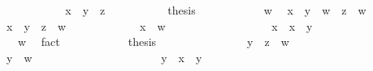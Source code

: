 \begin{isabellebody}
\isanewline
\ \ \ \ \ \ \isamarkupfalse%
\ \isamarkupfalse%
\ {\isachardoublequoteopen}{\isachardot}{\isachardot}{\isachardot}\ {\isasymsqsubseteq}\ x\ {\isasymsqunion}\ {\isacharparenleft}y\ {\isasymsqunion}\ z{\isacharparenright}{\isachardoublequoteclose}\ \isacommand{{\isachardot}{\isachardot}}\isamarkupfalse%
\isanewline
\ \ \ \ \ \ \isamarkupfalse%
\ \isamarkupfalse%
\ {\isacharquery}thesis\ \isacommand{{\isachardot}}\isamarkupfalse%
\isanewline
\ \ \ \ \isamarkupfalse%
\isanewline
\ \ \ \ \isamarkupfalse%
\ w\ \isamarkupfalse%
\ {\isachardoublequoteopen}x\ {\isasymsqunion}\ y\ {\isasymsqsubseteq}\ w{\isachardoublequoteclose}\ \ {\isachardoublequoteopen}z\ {\isasymsqsubseteq}\ w{\isachardoublequoteclose}\isanewline
\ \ \ \ \isamarkupfalse%
\ {\isachardoublequoteopen}x\ {\isasymsqunion}\ {\isacharparenleft}y\ {\isasymsqunion}\ z{\isacharparenright}\ {\isasymsqsubseteq}\ w{\isachardoublequoteclose}\isanewline
\ \ \ \ \isamarkupfalse%
\isanewline
\ \ \ \ \ \ \isamarkupfalse%
\ {\isachardoublequoteopen}x\ {\isasymsqsubseteq}\ w{\isachardoublequoteclose}\isanewline
\ \ \ \ \ \ \isamarkupfalse%
\ {\isacharminus}\isanewline
\ \ \ \ \ \ \ \ \isamarkupfalse%
\ {\isachardoublequoteopen}x\ {\isasymsqsubseteq}\ x\ {\isasymsqunion}\ y{\isachardoublequoteclose}\ \isacommand{{\isachardot}{\isachardot}}\isamarkupfalse%
\isanewline
\ \ \ \ \ \ \ \ \isamarkupfalse%
\ \isamarkupfalse%
\ {\isachardoublequoteopen}{\isasymdots}\ {\isasymsqsubseteq}\ w{\isachardoublequoteclose}\ \isamarkupfalse%
\ fact\isanewline
\ \ \ \ \ \ \ \ \isamarkupfalse%
\ \isamarkupfalse%
\ {\isacharquery}thesis\ \isacommand{{\isachardot}}\isamarkupfalse%
\isanewline
\ \ \ \ \ \ \isamarkupfalse%
\isanewline
\ \ \ \ \ \ \isamarkupfalse%
\ {\isachardoublequoteopen}y\ {\isasymsqunion}\ z\ {\isasymsqsubseteq}\ w{\isachardoublequoteclose}\isanewline
\ \ \ \ \ \ \isamarkupfalse%
\isanewline
\ \ \ \ \ \ \ \ \isamarkupfalse%
\ {\isachardoublequoteopen}y\ {\isasymsqsubseteq}\ w{\isachardoublequoteclose}\isanewline
\ \ \ \ \ \ \ \ \isamarkupfalse%
\ {\isacharminus}\isanewline
\ \ \ \ \ \ \ \ \ \ \isamarkupfalse%
\ {\isachardoublequoteopen}y\ {\isasymsqsubseteq}\ x\ {\isasymsqunion}\ y{\isachardoublequoteclose}\ \isacommand{{\isachardot}{\isachardot}}\isamarkupfalse%

\end{isabellebody}
